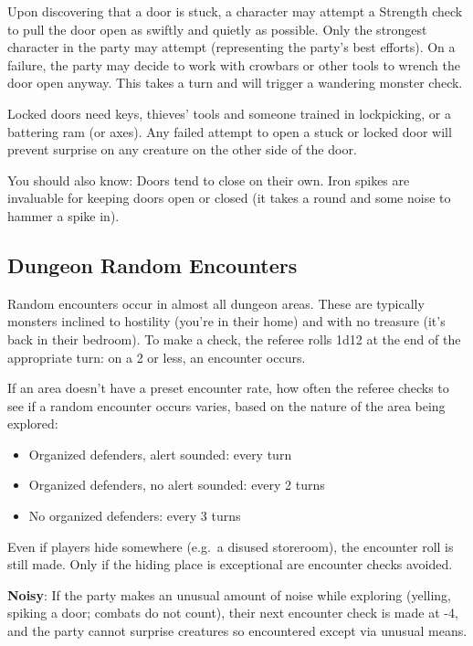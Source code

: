 \documentclass{article}
\begin{document}
\begin{multicols}{2}
Upon discovering that a door is stuck, a character may attempt a
Strength check to pull the door open as swiftly and quietly as possible.
Only the strongest character in the party may attempt (representing the
party's best efforts). On a failure, the party may decide to work with
crowbars or other tools to wrench the door open anyway. This takes a
turn and will trigger a wandering monster check.

Locked doors need keys, thieves' tools and someone trained in
lockpicking, or a battering ram (or axes). Any failed attempt to open a
stuck or locked door will prevent surprise on any creature on the other
side of the door.

You should also know: Doors tend to close on their own. Iron spikes are
invaluable for keeping doors open or closed (it takes a round and some
noise to hammer a spike in).

\subsection{Dungeon Random Encounters}\label{dungeon-random-encounters}

Random encounters occur in almost all dungeon areas. These are typically
monsters inclined to hostility (you're in their home) and with no
treasure (it's back in their bedroom). To make a check, the referee
rolls 1d12 at the end of the appropriate turn: on a 2 or less, an
encounter occurs.

If an area doesn't have a preset encounter rate, how often the referee
checks to see if a random encounter occurs varies, based on the nature
of the area being explored:

\begin{itemize}
\tightlist
\item
  Organized defenders, alert sounded: every turn
\item
  Organized defenders, no alert sounded: every 2 turns
\item
  No organized defenders: every 3 turns
\end{itemize}

Even if players hide somewhere (e.g.~a disused storeroom), the encounter
roll is still made. Only if the hiding place is exceptional are
encounter checks avoided.

\textbf{Noisy}: If the party makes an unusual amount of noise while
exploring (yelling, spiking a door; combats do not count), their next
encounter check is made at -4, and the party cannot surprise creatures
so encountered except via unusual means.


\end{multicols}
\end{document}
